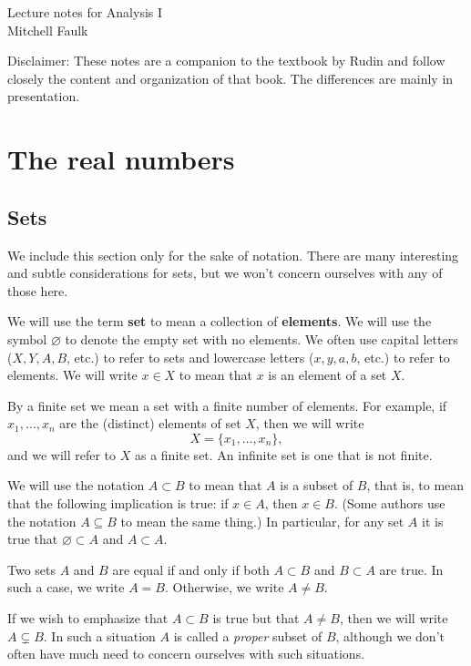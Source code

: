 \documentclass[12pt]{article}
\theoremstyle{definition}
\theoremstyle{theorem}
\begin{document}
\noindent Lecture notes for Analysis I \\ Mitchell Faulk

\medskip


\noindent Disclaimer: These notes are a companion to the textbook by Rudin and follow closely the content and organization of that book. The differences are mainly in presentation. 

\tableofcontents

\section{The real numbers}

\subsection{Sets}

We include this section only for the sake of notation. There are many interesting and subtle considerations for sets, but we won't concern ourselves with any of those here. 

We will use the term \textbf{set} to mean a collection of \textbf{elements}. We will use the symbol $\varnothing$ to denote the empty set with no elements. We often use capital letters ($X,Y, A,B$, etc.) to refer to sets and lowercase letters ($x,y,a,b$, etc.) to refer to elements. We will write $x \in X$ to mean that $x$ is an element of a set $X$. 

By a finite set we mean a set with a finite number of elements. For example, if $x_1, \ldots, x_n$ are the (distinct) elements of set $X$, then we will write 
\[
X = \{x_1, \ldots, x_n\},
\]
and we will refer to $X$ as a finite set. An infinite set is one that is not finite. 

We will use the notation $A \subset B$ to mean that $A$ is a subset of $B$, that is, to mean that the following implication is true: if $x \in A$, then $x \in B$.  (Some authors use the notation $A \subseteq B$ to mean the same thing.) In particular, for any set $A$ it is true that $\varnothing \subset A$ and $A \subset A$. 

Two sets $A$ and $B$ are equal if and only if both $A \subset B$ and $B \subset A$ are true. In such a case, we write $A = B$. Otherwise, we write $A \ne B$. 

If we wish to emphasize that $A \subset B$ is true but that $A \neq B$, then we will write $A \subsetneq B$. In such a situation $A$ is called a \emph{proper} subset of $B$, although we don't often have much need to concern ourselves with such situations.  
\end{document}
